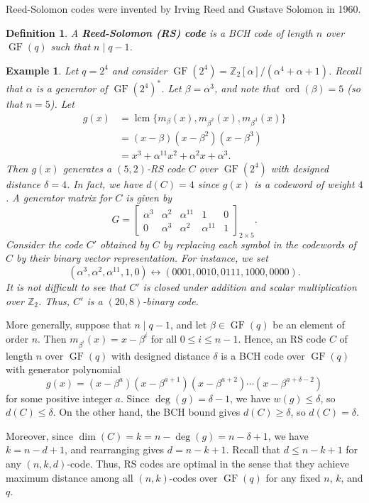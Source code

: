 \documentclass[10pt]{article}
\newcommand{\Z}{\mathbb{Z}}
\DeclareMathOperator{\ord}{ord}
\DeclareMathOperator{\GF}{GF}
\DeclareMathOperator{\lcm}{lcm}
\theoremstyle{newstyle}
\newtheorem{defn}[thm]{Definition}
\newtheorem{exmp}[thm]{Example}
\begin{document}
Reed-Solomon codes were invented by Irving Reed and Gustave Solomon in 1960. 

\begin{defn}
A {\bf Reed-Solomon (RS) code} is a BCH code of length $n$ over $\GF(q)$ such that $n \mid q-1$. 
\end{defn}

\begin{exmp}
Let $q = 2^4$ and consider $\GF(2^4) = \Z_2[\alpha]/(\alpha^4 + \alpha + 1)$. 
Recall that $\alpha$ is a generator of $\GF(2^4)^*$. Let $\beta = \alpha^3$, 
and note that $\ord(\beta) = 5$ (so that $n = 5$). Let 
\begin{align*}
    g(x) 
    &= \lcm \{m_\beta(x), m_{\beta^2}(x), m_{\beta^3}(x)\} \\
    &= (x-\beta)(x-\beta^2)(x-\beta^3) \\
    &= x^3 + \alpha^{11} x^2 + \alpha^2 x + \alpha^3. 
\end{align*}
Then $g(x)$ generates a $(5, 2)$-RS code $C$ over $\GF(2^4)$ with designed distance $\delta = 4$. 
In fact, we have $d(C) = 4$ since $g(x)$ is a codeword of weight $4$. A generator matrix for $C$ is 
given by 
\[ G = \begin{bmatrix}
\alpha^3 & \alpha^2 & \alpha^{11} & 1 & 0 \\ 0 & \alpha^3 & \alpha^2 & \alpha^{11} & 1
\end{bmatrix}_{2\times5}. \] 
Consider the code $C'$ obtained by $C$ by replacing each symbol in the codewords of $C$ 
by their binary vector representation. For instance, we set 
\[ (\alpha^3, \alpha^2, \alpha^{11}, 1, 0) \leftrightarrow (0001, 0010, 0111, 1000, 0000). \]
It is not difficult to see that $C'$ is closed under addition and scalar multiplication over 
$\Z_2$. Thus, $C'$ is a $(20, 8)$-binary code. 
\end{exmp}

More generally, suppose that $n \mid q-1$, and let $\beta \in \GF(q)$ be an element of order $n$. 
Then $m_{\beta^i}(x) = x - \beta^i$ for all $0 \leq i \leq n-1$. Hence, an RS code $C$ of length $n$ 
over $\GF(q)$ with designed distance $\delta$ is a BCH code over $\GF(q)$ with generator polynomial 
\[ g(x) = (x-\beta^a)(x-\beta^{a+1})(x - \beta^{a+2}) \cdots (x - \beta^{a+\delta-2}) \]
for some positive integer $a$. Since $\deg(g) = \delta - 1$, we have $w(g) \leq \delta$, so 
$d(C) \leq \delta$. On the other hand, the BCH bound gives $d(C) \geq \delta$, so $d(C) = \delta$. 

Moreover, since $\dim(C) = k = n-\deg(g) = n -\delta+1$, we have $k = n-d+1$, and rearranging
gives $d = n-k+1$. 
Recall that $d \leq n-k+1$ for any $(n, k, d)$-code. Thus, RS codes are optimal in the sense that 
they achieve maximum distance among all $(n, k)$-codes over $\GF(q)$ for any fixed $n$, $k$, and $q$. 
\end{document}
